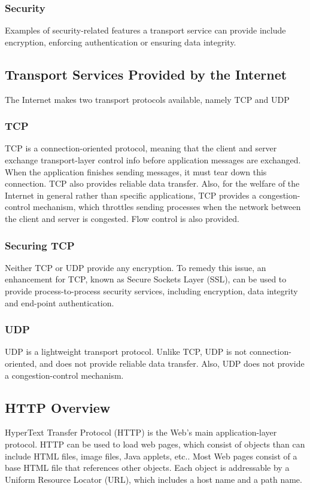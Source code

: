 \documentclass[12pt,titlepage]{article}
\begin{document}
      \subsubsection{Security}
        Examples of security-related features a transport service can provide include encryption, enforcing authentication or ensuring data integrity.

    \subsection{Transport Services Provided by the Internet}
      The Internet makes two transport protocols available, namely TCP and UDP

      \subsubsection{TCP}
        TCP is a connection-oriented protocol, meaning that the client and server exchange transport-layer control info before application messages are exchanged. When the
        application finishes sending messages, it must tear down this connection. TCP also provides reliable data transfer. Also, for the welfare of the Internet in general
        rather than specific applications, TCP provides a congestion-control mechanism, which throttles sending processes when the network between the client and server
        is congested. Flow control is also provided.

        \subsubsection{Securing TCP}
          Neither TCP or UDP provide any encryption. To remedy this issue, an enhancement for TCP, known as Secure Sockets Layer (SSL), can be used to provide process-to-process
          security services, including encryption, data integrity and end-point authentication.

      \subsubsection{UDP}
        UDP is a lightweight transport protocol. Unlike TCP, UDP is not connection-oriented, and does not provide reliable data transfer. Also, UDP does not provide a
        congestion-control mechanism.

    \subsection{HTTP Overview}
      HyperText Transfer Protocol (HTTP) is the Web's main application-layer protocol. HTTP can be used to load web pages, which consist of objects than can include HTML files,
      image files, Java applets, etc.. Most Web pages consist of a base HTML file that references other objects. Each object is addressable by a Uniform Resource Locator (URL),
      which includes a host name and a path name.
\end{document}

